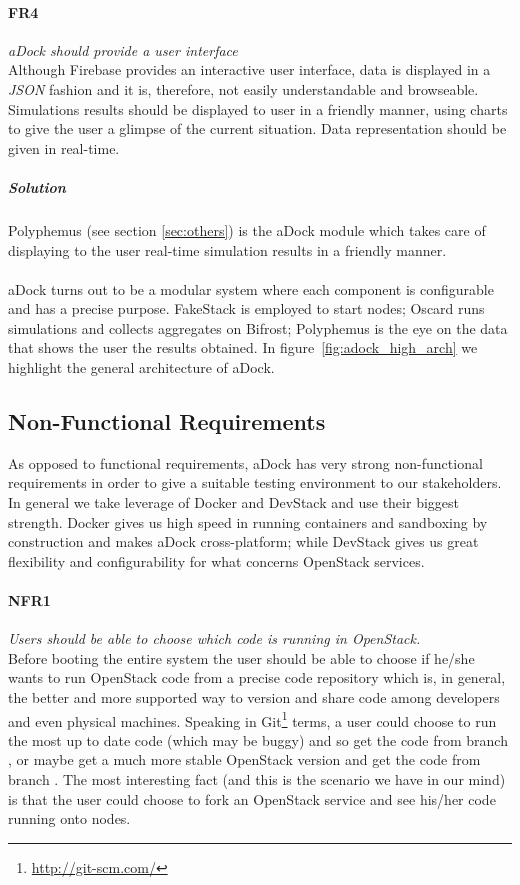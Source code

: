 \paragraph{FR4}\label{p:fr4} \emph{aDock should provide a user interface} \hfill \\
Although Firebase provides an interactive user interface, data is displayed in a \textit{JSON} fashion and it is, therefore, not easily understandable and browseable. Simulations results should be displayed to user in a friendly manner, using charts to give the user a glimpse of the current situation. Data representation should be given in real-time.
\subparagraph{Solution} Polyphemus (see section \ref{sec:others}) is the aDock module which takes care of displaying to the user real-time simulation results in a friendly manner.

\paragraph{}\label{p:adock_archi} aDock turns out to be a modular system where each component is configurable and has a precise purpose. FakeStack is employed to start nodes; Oscard runs simulations and collects aggregates on Bifrost; Polyphemus is the eye on the data that shows the user the results obtained.
In figure~\ref{fig:adock_high_arch} we highlight the general architecture of aDock.


\subsection{Non-Functional Requirements}
\label{sub:nonfunc_req}
As opposed to functional requirements, aDock has very strong non-functional requirements in order to give a suitable testing environment to our stakeholders. In general we take leverage of Docker and DevStack and use their biggest strength. Docker gives us high speed in running containers and sandboxing by construction and makes aDock cross-platform; while DevStack gives us great flexibility and configurability for what concerns OpenStack services.

\paragraph{NFR1}\label{p:nfr1} \emph{Users should be able to choose which code is running in OpenStack.} \hfill \\
Before booting the entire system the user should be able to choose if he/she wants to run OpenStack code from a precise code repository which is, in general, the better and more supported way to version and share code among developers and even physical machines. Speaking in Git\footnote{\url{http://git-scm.com/}} terms, a user could choose to run the most up to date code (which may be buggy) and so get the code from branch , or maybe get a much more stable OpenStack version and get the code from branch . The most interesting fact (and this is the scenario we have in our mind) is that the user could choose to fork an OpenStack service and see his/her code running onto nodes.

